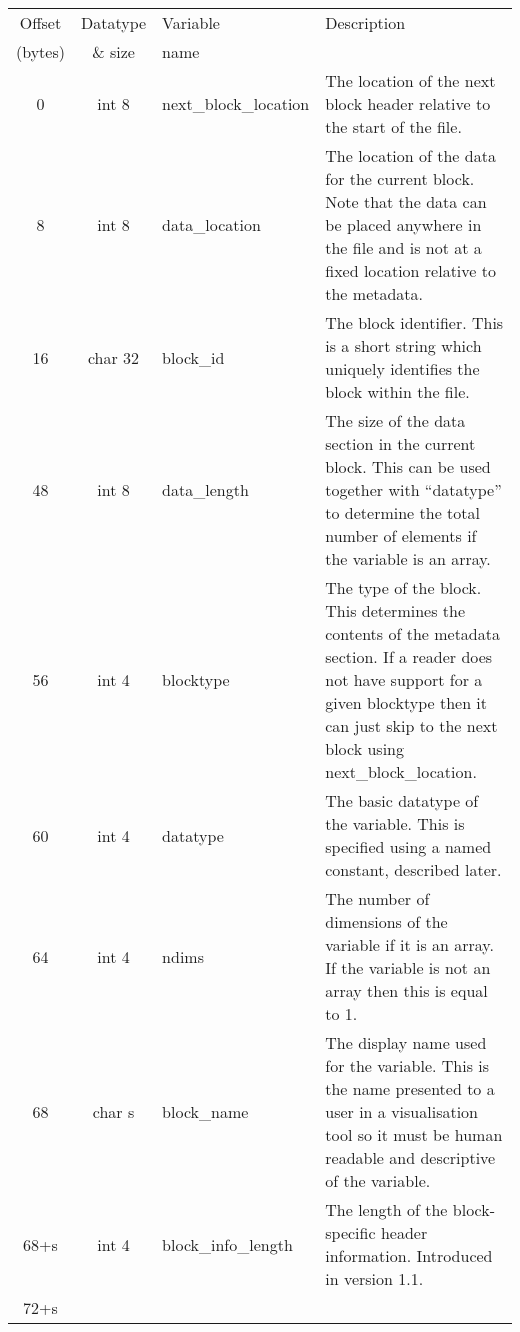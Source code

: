 \documentclass[12pt]{article}
\begin{document}
\begin{center}
\begin{tabularx}{0.9\textwidth}[!hbt]{cclX}
  Offset & Datatype & Variable & Description\\
  (bytes) & \& size & name &
  \\\toprule

  0 & int 8 & next\_block\_location & The location of the next
  block header relative to the start of the file.
  \\\midrule

  8 & int 8 & data\_location & The location of the data for the current block.
  Note that the data can be placed anywhere in the file and is not at a fixed
  location relative to the metadata.
  \\\midrule

  16 & char 32 & block\_id & The block identifier. This is a short string
  which uniquely identifies the block within the file.
  \\\midrule

  48 & int 8 & data\_length & The size of the data section in the current block.
  This can be used together with ``datatype'' to determine the total number
  of elements if the variable is an array.
  \\\midrule

  56 & int 4 & blocktype & The type of the block. This determines the contents
  of the metadata section. If a reader does not have support for a given
  blocktype then it can just skip to the next block using next\_block\_location.
  \\\midrule

  60 & int 4 & datatype & The basic datatype of the variable. This is
  specified using a named constant, described later.
  \\\midrule

  64 & int 4 & ndims & The number of dimensions of the variable if
  it is an array. If the variable is not an array then this is equal to 1.
  \\\midrule

  68 & char s & block\_name & The display name used for the variable. This
  is the name presented to a user in a visualisation tool so it must be
  human readable and descriptive of the variable.
  \\\midrule

  68+s & int 4 & block\_info\_length & The length of the block-specific
  header information. Introduced in version 1.1.
  \\\midrule

  72+s &
\end{tabularx}
\end{center}\vspace{10pt}
\end{document}
